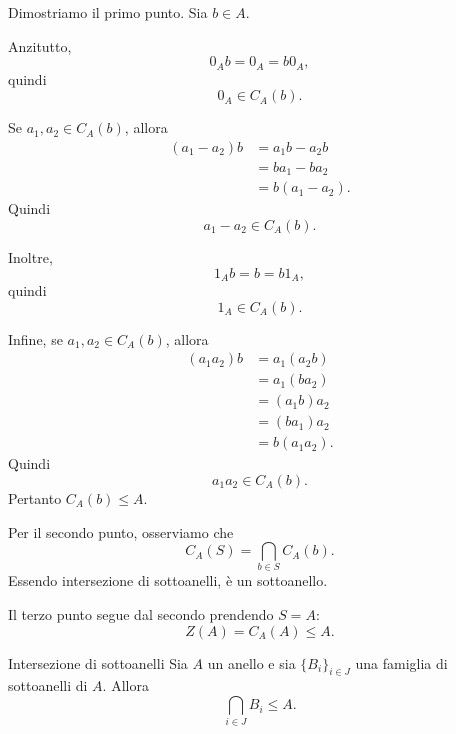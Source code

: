 \documentclass[a4paper]{article}
\begin{document}
\begin{radioactive}
\begin{snippetproof}{}
    Dimostriamo il primo punto. Sia \(b \in A\).

    Anzitutto,
    \[
        0_A b=0_A=b0_A,
    \]
    quindi
    \[
        0_A \in C_A(b).
    \]

    Se \(a_1,a_2 \in C_A(b)\), allora
    \begin{align*}
        (a_1-a_2)b
        &=
        a_1b-a_2b \\
        &=
        ba_1-ba_2 \\
        &=
        b(a_1-a_2).
    \end{align*}
    Quindi
    \[
        a_1-a_2 \in C_A(b).
    \]

    Inoltre,
    \[
        1_A b=b=b1_A,
    \]
    quindi
    \[
        1_A \in C_A(b).
    \]

    Infine, se \(a_1,a_2 \in C_A(b)\), allora
    \begin{align*}
        (a_1a_2)b
        &=
        a_1(a_2b) \\
        &=
        a_1(ba_2) \\
        &=
        (a_1b)a_2 \\
        &=
        (ba_1)a_2 \\
        &=
        b(a_1a_2).
    \end{align*}
    Quindi
    \[
        a_1a_2 \in C_A(b).
    \]
    Pertanto \(C_A(b)\leq A\).

    Per il secondo punto, osserviamo che
    \[
        C_A(S)=\bigcap_{b\in S} C_A(b).
    \]
    Essendo intersezione di sottoanelli, è un sottoanello.

    Il terzo punto segue dal secondo prendendo \(S=A\):
    \[
        Z(A)=C_A(A)\leq A.
    \]
\end{snippetproof}
\end{radioactive}

\begin{radioactive}
\begin{snippetproposition}{Intersezione di sottoanelli}
    Sia \(A\) un anello e sia \(\{B_i\}_{i\in J}\) una famiglia di sottoanelli di \(A\).
    Allora
    \[
        \bigcap_{i\in J} B_i
        \leq A.
    \]
\end{snippetproposition}
\end{radioactive}
\end{document}
